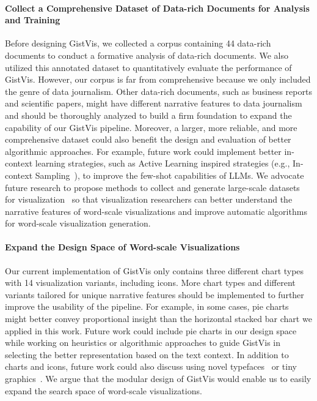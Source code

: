 \paragraph{Collect a Comprehensive Dataset of Data-rich Documents for Analysis and Training}
Before designing GistVis, we collected a corpus containing 44 data-rich documents to conduct a formative analysis of data-rich documents. We also utilized this annotated dataset to quantitatively evaluate the performance of GistVis. However, our corpus is far from comprehensive because we only included the genre of data journalism. Other data-rich documents, such as business reports and scientific papers, might have different narrative features to data journalism and should be thoroughly analyzed to build a firm foundation to expand the capability of our GistVis pipeline. Moreover, a larger, more reliable, and more comprehensive dataset could also benefit the design and evaluation of better algorithmic approaches. For example, future work could implement better in-context learning strategies, such as Active Learning inspired strategies (e.g., In-context Sampling~\cite{yao2024more}), to improve the few-shot capabilities of LLMs. We advocate future research to propose methods to collect and generate large-scale datasets for visualization~\cite{wu2022ai4vis} so that visualization researchers can better understand the narrative features of word-scale visualizations and improve automatic algorithms for word-scale visualization generation.

\paragraph{Expand the Design Space of Word-scale Visualizations}
Our current implementation of GistVis only contains three different chart types with 14 visualization variants, including icons. More chart types and different variants tailored for unique narrative features should be implemented to further improve the usability of the pipeline. For example, in some cases, pie charts might better convey proportional insight than the horizontal stacked bar chart we applied in this work. Future work could include pie charts in our design space while working on heuristics or algorithmic approaches to guide GistVis in selecting the better representation based on the text context. In addition to charts and icons, future work could also discuss using novel typefaces~\cite{nacenta2012fatfonts} or tiny graphics~\cite{zhao2020iconate}. We argue that the modular design of GistVis would enable us to easily expand the search space of word-scale visualizations.

